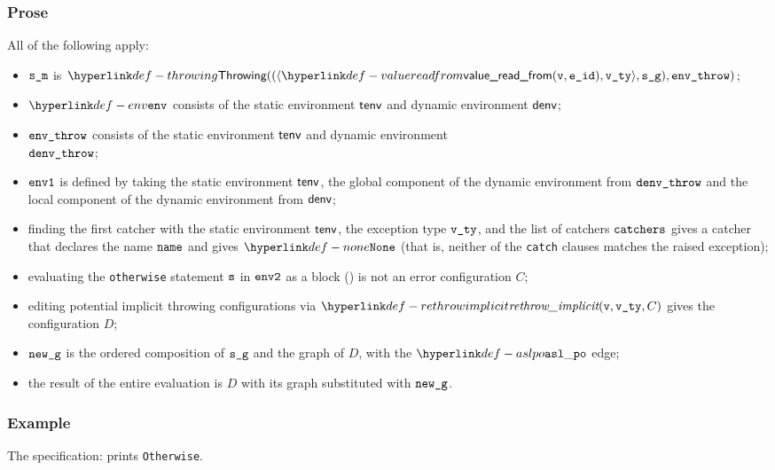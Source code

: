   \subsubsection{Prose}
  All of the following apply:
  \begin{itemize}
    \item $\texttt{s\_m}$ is $\Throwing((\langle \valuereadfrom(\vv, \eid), \vvty \rangle, \sg), \envthrow)$;
    \item $\env$ consists of the static environment $\textsf{tenv}$ and dynamic environment $\textsf{denv}$;
    \item $\texttt{env\_throw}$ consists of the static environment $\textsf{tenv}$ and dynamic environment \\ $\texttt{denv\_throw}$;
    \item $\texttt{env1}$ is defined by taking the static environment $\textsf{tenv}$, the global component of the dynamic
    environment from $\texttt{denv\_throw}$ and the local component of the dynamic environment from $\textsf{denv}$;
    \item finding the first catcher with the static environment $\textsf{tenv}$, the exception type $\texttt{v\_ty}$,
    and the list of catchers $\texttt{catchers}$ gives a catcher that declares the name $\texttt{name}$ and gives $\None$
    (that is, neither of the \texttt{catch} clauses matches the raised exception);
    \item evaluating the \texttt{otherwise} statement $\texttt{s}$ in $\texttt{env2}$ as a block ()
    is not an error configuration $C$\ProseOrError;
    \item editing potential implicit throwing configurations via $\rethrowimplicit(\vv, \vvty, C)$
    gives the configuration $D$;
    \item $\texttt{new\_g}$ is the ordered composition of $\texttt{s\_g}$ and the graph of $D$,
    with the $\aslpo$ edge;
    \item the result of the entire evaluation is $D$ with its graph substituted with $\texttt{new\_g}$.
  \end{itemize}

    \subsubsection{Example}
     The specification:
     prints \texttt{Otherwise}.


